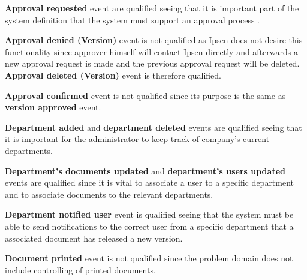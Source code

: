 \textbf{Approval requested} event are qualified seeing that it is important part of the system definition that the system must support an approval process %
. 

\textbf{Approval denied (Version)} event is not qualified as Ipsen does not desire this functionality since approver himself will contact Ipsen directly and afterwards a new approval request is made and the previous approval request will be deleted. \textbf{Approval deleted (Version)} event is therefore qualified.

\textbf{Approval confirmed} event is not qualified since its purpose is the same as \textbf{version approved} event.

\textbf{Department added} and \textbf{department deleted} events are qualified seeing that it is important for the administrator to keep track of company's current departments.

\textbf{Department's documents updated} and \textbf{department's users updated} events are qualified since it is vital to associate a user to a specific department and to associate documents to the relevant departments. 

\textbf{Department notified user} event is qualified seeing that the system must be able to send notifications to the correct user from a specific department that a associated document has released a new version. 

\textbf{Document printed} event is not qualified since the problem domain does not include controlling of printed documents.

